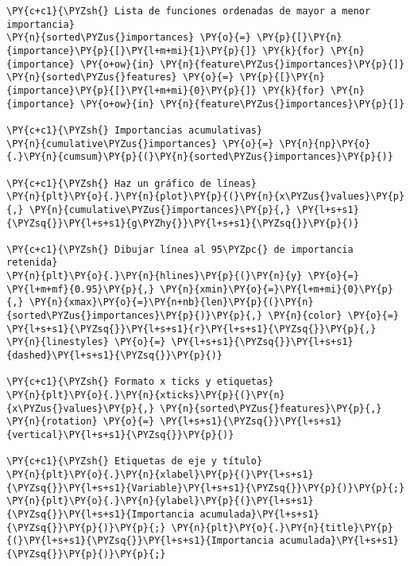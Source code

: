     \begin{tcolorbox}[breakable, size=fbox, boxrule=1pt, pad at break*=1mm,colback=cellbackground, colframe=cellborder]
\begin{Verbatim}[commandchars=\\\{\}]
\PY{c+c1}{\PYZsh{} Lista de funciones ordenadas de mayor a menor importancia}
\PY{n}{sorted\PYZus{}importances} \PY{o}{=} \PY{p}{[}\PY{n}{importance}\PY{p}{[}\PY{l+m+mi}{1}\PY{p}{]} \PY{k}{for} \PY{n}{importance} \PY{o+ow}{in} \PY{n}{feature\PYZus{}importances}\PY{p}{]}
\PY{n}{sorted\PYZus{}features} \PY{o}{=} \PY{p}{[}\PY{n}{importance}\PY{p}{[}\PY{l+m+mi}{0}\PY{p}{]} \PY{k}{for} \PY{n}{importance} \PY{o+ow}{in} \PY{n}{feature\PYZus{}importances}\PY{p}{]}

\PY{c+c1}{\PYZsh{} Importancias acumulativas}
\PY{n}{cumulative\PYZus{}importances} \PY{o}{=} \PY{n}{np}\PY{o}{.}\PY{n}{cumsum}\PY{p}{(}\PY{n}{sorted\PYZus{}importances}\PY{p}{)}

\PY{c+c1}{\PYZsh{} Haz un gráfico de líneas}
\PY{n}{plt}\PY{o}{.}\PY{n}{plot}\PY{p}{(}\PY{n}{x\PYZus{}values}\PY{p}{,} \PY{n}{cumulative\PYZus{}importances}\PY{p}{,} \PY{l+s+s1}{\PYZsq{}}\PY{l+s+s1}{g\PYZhy{}}\PY{l+s+s1}{\PYZsq{}}\PY{p}{)}

\PY{c+c1}{\PYZsh{} Dibujar línea al 95\PYZpc{} de importancia retenida}
\PY{n}{plt}\PY{o}{.}\PY{n}{hlines}\PY{p}{(}\PY{n}{y} \PY{o}{=} \PY{l+m+mf}{0.95}\PY{p}{,} \PY{n}{xmin}\PY{o}{=}\PY{l+m+mi}{0}\PY{p}{,} \PY{n}{xmax}\PY{o}{=}\PY{n+nb}{len}\PY{p}{(}\PY{n}{sorted\PYZus{}importances}\PY{p}{)}\PY{p}{,} \PY{n}{color} \PY{o}{=} \PY{l+s+s1}{\PYZsq{}}\PY{l+s+s1}{r}\PY{l+s+s1}{\PYZsq{}}\PY{p}{,} \PY{n}{linestyles} \PY{o}{=} \PY{l+s+s1}{\PYZsq{}}\PY{l+s+s1}{dashed}\PY{l+s+s1}{\PYZsq{}}\PY{p}{)}

\PY{c+c1}{\PYZsh{} Formato x ticks y etiquetas}
\PY{n}{plt}\PY{o}{.}\PY{n}{xticks}\PY{p}{(}\PY{n}{x\PYZus{}values}\PY{p}{,} \PY{n}{sorted\PYZus{}features}\PY{p}{,} \PY{n}{rotation} \PY{o}{=} \PY{l+s+s1}{\PYZsq{}}\PY{l+s+s1}{vertical}\PY{l+s+s1}{\PYZsq{}}\PY{p}{)}

\PY{c+c1}{\PYZsh{} Etiquetas de eje y título}
\PY{n}{plt}\PY{o}{.}\PY{n}{xlabel}\PY{p}{(}\PY{l+s+s1}{\PYZsq{}}\PY{l+s+s1}{Variable}\PY{l+s+s1}{\PYZsq{}}\PY{p}{)}\PY{p}{;} \PY{n}{plt}\PY{o}{.}\PY{n}{ylabel}\PY{p}{(}\PY{l+s+s1}{\PYZsq{}}\PY{l+s+s1}{Importancia acumulada}\PY{l+s+s1}{\PYZsq{}}\PY{p}{)}\PY{p}{;} \PY{n}{plt}\PY{o}{.}\PY{n}{title}\PY{p}{(}\PY{l+s+s1}{\PYZsq{}}\PY{l+s+s1}{Importancia acumulada}\PY{l+s+s1}{\PYZsq{}}\PY{p}{)}\PY{p}{;}
\end{Verbatim}
\end{tcolorbox}

